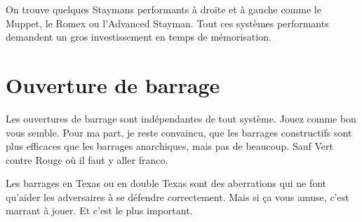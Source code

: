 \documentclass[a4paper,12pt, french]{book}
\begin{document}
On trouve quelques Staymans performants à droite et à gauche comme le Muppet, le Romex ou l'Advanced Stayman. Tout ces systèmes performants demandent un gros investissement en temps de mémorisation.

\section*{Ouverture de barrage}

Les ouvertures de barrage sont indépendantes de tout système. Jouez comme bon vous semble. Pour ma part, je reste convaincu, que les barrages constructifs sont plus efficaces que les barrages anarchiques, mais pas de beaucoup. Sauf Vert contre Rouge où il faut y aller franco.

Les barrages en Texas ou en double Texas sont des aberrations qui ne font qu'aider les adversaires à se défendre correctement.
Mais si ça vous amuse, c'est marrant à jouer. Et c'est le plus important.
\end{document}
